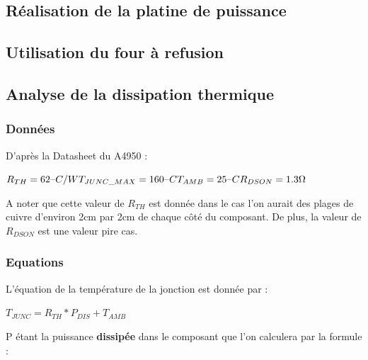 \documentclass[11pt, french]{article} %
\begin{document}
\subsection{Réalisation de la platine de puissance}

\subsection{Utilisation du four à refusion}

\subsection{Analyse de la dissipation thermique}



\subsubsection{Données}

\noindent
D'après la Datasheet du A4950 :

\vspace{0.5cm}

\noindent
$ 
R_{TH} = 62 \char123C/W  \\
T_{JUNC\_MAX} = 160 \char123C  \\
T_{AMB} = 25\char123C  \\
R_{DSON} = 1.3 \Omega  \\
$



\noindent
A noter que cette valeur de $R_{TH}$ est donnée dans le cas l'on aurait des plages de cuivre d'environ 2cm par 2cm de chaque côté du composant. De plus, la valeur de $R_{DSON}$ est une valeur pire cas.

\subsubsection{Equations}

\noindent
L'équation de la température de la jonction est donnée par :

\vspace{0.5cm}

\noindent
$
T_{JUNC} = R_{TH} * P_{DIS} + T_{AMB}
$

\vspace{0.5cm}

\noindent
P étant la puissance \textbf{dissipée} dans le composant que l'on calculera par la formule :

\vspace{0.5cm}
\end{document}
